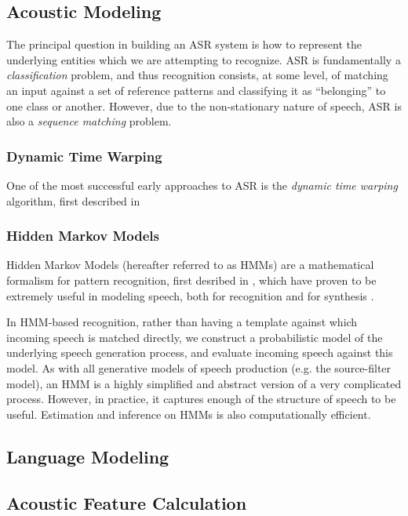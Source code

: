 \documentclass{article}
\begin{document}
\subsection{Acoustic Modeling}
\label{sec:hmm}

The principal question in building an ASR system is how to represent
the underlying entities which we are attempting to recognize.  ASR is
fundamentally a {\em classification} problem, and thus recognition
consists, at some level, of matching an input against a set of
reference patterns and classifying it as ``belonging'' to one class or
another.  However, due to the non-stationary nature of speech, ASR is
also a {\em sequence matching} problem.

\subsubsection{Dynamic Time Warping}
\label{sec:dtw}

One of the most successful early approaches to ASR is the {\em dynamic
  time warping} algorithm, first described in \cite{itakura1975}

\subsubsection{Hidden Markov Models}
\label{sec:hmm}

Hidden Markov Models (hereafter referred to as HMMs) are a
mathematical formalism for pattern recognition, first desribed in
\cite{baum1966}, which have proven to be extremely useful in modeling
speech, both for recognition \cite{rabiner1989} and for synthesis
\cite{masuko1996}.

In HMM-based recognition, rather than having a template against which
incoming speech is matched directly, we construct a probabilistic
model of the underlying speech generation process, and evaluate
incoming speech against this model.  As with all generative models of
speech production (e.g. the source-filter model), an HMM is a highly
simplified and abstract version of a very complicated process.
However, in practice, it captures enough of the structure of speech to
be useful.  Estimation and inference on HMMs is also computationally
efficient.

\subsection{Language Modeling}
\label{sec:ngrams}

\subsection{Acoustic Feature Calculation}
\label{sec:fe}
\end{document}
